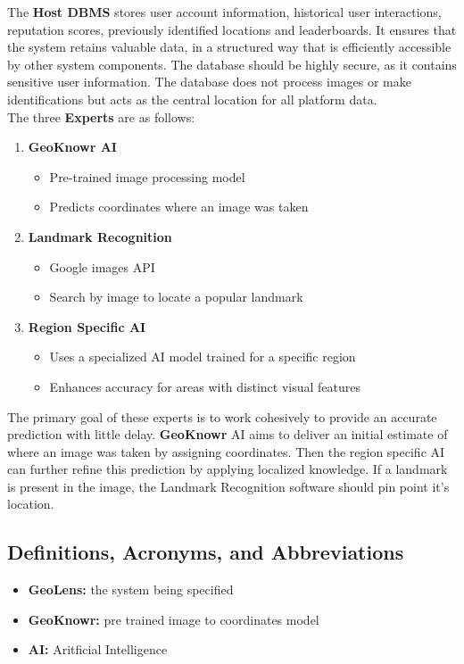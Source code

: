 \documentclass[]{article}
\begin{document}
The \textbf{Host DBMS} stores user account information, historical user interactions, reputation scores, previously identified locations and leaderboards. It ensures that the system retains valuable data,
in a structured way that is efficiently accessible by other system components. The database should be highly secure, as it contains sensitive user information. The database does not process images or make
identifications but acts as the central location for all platform data. \\

The three \textbf{Experts} are as follows:
\begin{enumerate}
    \item \textbf{GeoKnowr AI}
    \begin{itemize}
        \item Pre-trained image processing model
        \item Predicts coordinates where an image was taken
    \end{itemize}
    \item \textbf{Landmark Recognition}
    \begin{itemize}
        \item Google images API
        \item Search by image to locate a popular landmark
    \end{itemize}
	\item \textbf{Region Specific AI}
	\begin{itemize}
        \item Uses a specialized AI model trained for a specific region
        \item Enhances accuracy for areas with distinct visual features
    \end{itemize}
\end{enumerate}

The primary goal of these experts is to work cohesively to provide an accurate prediction with little delay. \textbf{GeoKnowr} AI aims to deliver an initial estimate
of where an image was taken by assigning coordinates. Then the region specific AI can further refine this prediction by applying localized knowledge. If a landmark is 
present in the image, the Landmark Recognition software should pin point it's location.

\subsection{Definitions, Acronyms, and Abbreviations}
\label{sub:definitions_acronyms_and_abbreviations}
\begin{itemize}
	\item \textbf{GeoLens:} the system being specified
    \item \textbf{GeoKnowr:} pre trained image to coordinates model
	\item \textbf{AI:} Aritficial Intelligence
\end{itemize}
\end{document}
